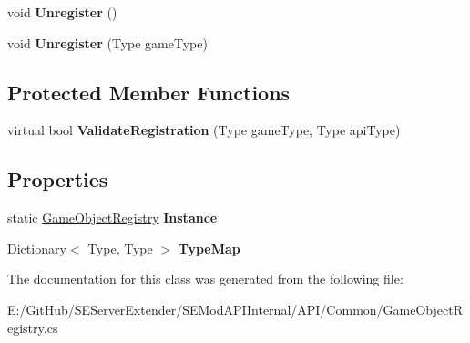 \begin{DoxyCompactItemize}
\item 
\hypertarget{class_s_e_mod_a_p_i_internal_1_1_a_p_i_1_1_common_1_1_game_object_registry_a61bc2baab86cc4fc433586c9f1ace6de}{}void {\bfseries Unregister} ()\label{class_s_e_mod_a_p_i_internal_1_1_a_p_i_1_1_common_1_1_game_object_registry_a61bc2baab86cc4fc433586c9f1ace6de}

\item 
\hypertarget{class_s_e_mod_a_p_i_internal_1_1_a_p_i_1_1_common_1_1_game_object_registry_a4c6d2e7cc7f48a48b6b10b04a63fa164}{}void {\bfseries Unregister} (Type game\+Type)\label{class_s_e_mod_a_p_i_internal_1_1_a_p_i_1_1_common_1_1_game_object_registry_a4c6d2e7cc7f48a48b6b10b04a63fa164}

\end{DoxyCompactItemize}
\subsection*{Protected Member Functions}
\begin{DoxyCompactItemize}
\item 
\hypertarget{class_s_e_mod_a_p_i_internal_1_1_a_p_i_1_1_common_1_1_game_object_registry_ae2917ab8c7df9b31c03b98439c79cf79}{}virtual bool {\bfseries Validate\+Registration} (Type game\+Type, Type api\+Type)\label{class_s_e_mod_a_p_i_internal_1_1_a_p_i_1_1_common_1_1_game_object_registry_ae2917ab8c7df9b31c03b98439c79cf79}

\end{DoxyCompactItemize}
\subsection*{Properties}
\begin{DoxyCompactItemize}
\item 
\hypertarget{class_s_e_mod_a_p_i_internal_1_1_a_p_i_1_1_common_1_1_game_object_registry_a428a2807d8846d7c0389afe743b5aad5}{}static \hyperlink{class_s_e_mod_a_p_i_internal_1_1_a_p_i_1_1_common_1_1_game_object_registry}{Game\+Object\+Registry} {\bfseries Instance}\label{class_s_e_mod_a_p_i_internal_1_1_a_p_i_1_1_common_1_1_game_object_registry_a428a2807d8846d7c0389afe743b5aad5}

\item 
\hypertarget{class_s_e_mod_a_p_i_internal_1_1_a_p_i_1_1_common_1_1_game_object_registry_a067b87badbf5139bf5ae0da28cdfcdaa}{}Dictionary$<$ Type, Type $>$ {\bfseries Type\+Map}\label{class_s_e_mod_a_p_i_internal_1_1_a_p_i_1_1_common_1_1_game_object_registry_a067b87badbf5139bf5ae0da28cdfcdaa}

\end{DoxyCompactItemize}


The documentation for this class was generated from the following file\+:\begin{DoxyCompactItemize}
\item 
E\+:/\+Git\+Hub/\+S\+E\+Server\+Extender/\+S\+E\+Mod\+A\+P\+I\+Internal/\+A\+P\+I/\+Common/Game\+Object\+Registry.\+cs\end{DoxyCompactItemize}
